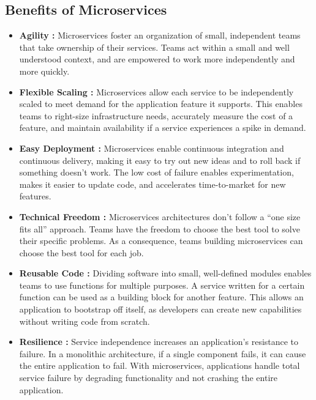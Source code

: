 \subsection{Benefits of Microservices}
\begin{itemize}
	\item \textbf{Agility :} Microservices foster an organization of small, independent teams that take ownership of their services. Teams act within a small and well understood context, and are empowered to work more independently and more quickly.
	\item \textbf{Flexible Scaling :} Microservices allow each service to be independently scaled to meet demand for the application feature it supports. This enables teams to right-size infrastructure needs, accurately measure the cost of a feature, and maintain availability if a service experiences a spike in demand.
	\item \textbf{Easy Deployment :} Microservices enable continuous integration and continuous delivery, making it easy to try out new ideas and to roll back if something doesn’t work. The low cost of failure enables experimentation, makes it easier to update code, and accelerates time-to-market for new features.
	\item \textbf{Technical Freedom :} Microservices architectures don’t follow a “one size fits all” approach. Teams have the freedom to choose the best tool to solve their specific problems. As a consequence, teams building microservices can choose the best tool for each job.
	\item \textbf{Reusable Code :} Dividing software into small, well-defined modules enables teams to use functions for multiple purposes. A service written for a certain function can be used as a building block for another feature. This allows an application to bootstrap off itself, as developers can create new capabilities without writing code from scratch.
	\item \textbf{Resilience :} Service independence increases an application’s resistance to failure. In a monolithic architecture, if a single component fails, it can cause the entire application to fail. With microservices, applications handle total service failure by degrading functionality and not crashing the entire application.
\end{itemize}

